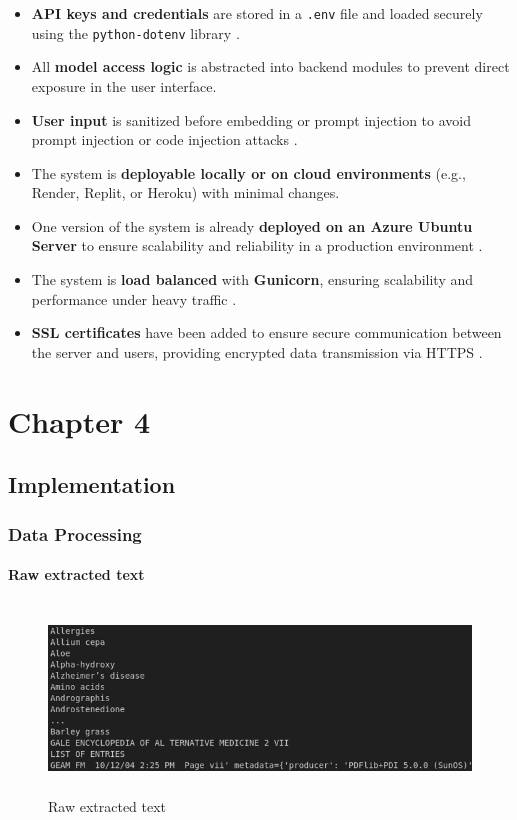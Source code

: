 \documentclass[12pt,a4paper]{report}
\begin{document}
\begin{itemize}
    \item \textbf{API keys and credentials} are stored in a \texttt{.env} file and loaded securely using the \texttt{python-dotenv} library \cite{python_dotenv}.
    \item All \textbf{model access logic} is abstracted into backend modules to prevent direct exposure in the user interface.
    \item \textbf{User input} is sanitized before embedding or prompt injection to avoid prompt injection or code injection attacks \cite{prompt_injection}.
    \item The system is \textbf{deployable locally or on cloud environments} (e.g., Render, Replit, or Heroku) with minimal changes.
    \item One version of the system is already \textbf{deployed on an Azure Ubuntu Server} to ensure scalability and reliability in a production environment \cite{azure_docs}.
    \item The system is \textbf{load balanced} with \textbf{Gunicorn}, ensuring scalability and performance under heavy traffic \cite{gunicorn_docs}.
    \item \textbf{SSL certificates} have been added to ensure secure communication between the server and users, providing encrypted data transmission via HTTPS \cite{mozilla_ssl}.
\end{itemize}





	{\vfill \chapter*{\centering \vfill Chapter 4 \vfill}\vfill}
	\thispagestyle{empty}
	\newpage
	\label{Implementation}
	\section{Implementation}
\label{Data Processing}
\subsection{Data Processing}

\subsubsection{Raw extracted text}
\begin{figure}[H]
    \centering
    \includegraphics[width=15cm, height=5cm]{RawExtractedText}
    \caption{Raw extracted text}
    \label{fig:extracted_text[4]}
\end{figure}
\end{document}
